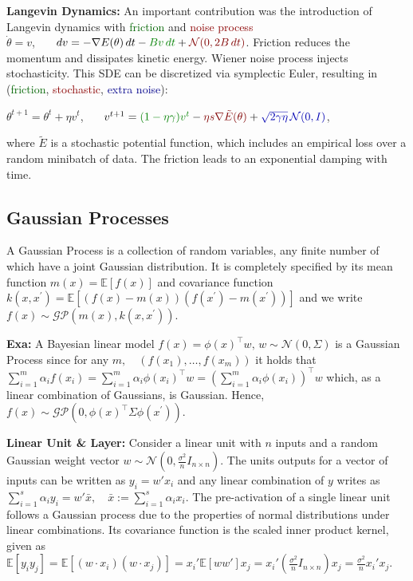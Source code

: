 \textbf{ Langevin Dynamics:}  An important contribution was the introduction of Langevin dynamics with \textcolor{darkgreen}{friction}
and \textcolor{darkred}{noise process}\\
$
\dot{\theta} = v
$, \ \ \
$
dv = -\nabla E(\theta) \, dt - \textcolor{darkgreen}{Bv \, dt} + \textcolor{darkred}{ \mathcal{N}(0, 2B \, dt)}
$.
Friction reduces the momentum and dissipates kinetic energy. Wiener noise process injects stochasticity. This SDE can be discretized via symplectic Euler, resulting in (\textcolor{darkgreen}{friction}, \textcolor{darkred}{stochastic}, \textcolor{darkblue}{extra noise}):
 
$
\theta^{t+1} = \theta^t + \eta v^t
$, \ \ \
$
v^{t+1} = \textcolor{darkgreen}{(1 - \eta \gamma) v^t} 
- \textcolor{darkred}{\eta s \nabla \tilde{E}(\theta)} 
+ \textcolor{darkblue}{\sqrt{2 \gamma \eta} \, \mathcal{N}(0, I)}
$,

where $\tilde{E}$ is a stochastic potential function, which includes an empirical loss over a random
 minibatch of data. The friction leads to an exponential damping with time.

\subsection{Gaussian Processes}
A Gaussian Process is a collection of random variables, any finite number of which have a joint Gaussian distribution. It is completely specified by its mean function $m(x)=\mathbb{E}[f(x)]$ and covariance function \(k(x, x^\prime)=\mathbb{E}[(f(x)-m(x))(f(x^\prime)-m(x^\prime))]\) and we write $f(x)\sim \mathcal{GP}(m(x), k(x, x^\prime))$. 

\textbf{Exa:} A Bayesian linear model $f(x)=\phi(x)^\top w, \, w\sim \mathcal{N}(0, \Sigma)$ is a Gaussian Process since for any $m, \quad (f(x_1), \ldots, f(x_m))$ it holds that \(\sum_{i=1}^m \alpha_i f(x_i) = \sum_{i=1}^m \alpha_i \phi(x_i)^\top w = (\sum_{i=1}^m \alpha_i \phi(x_i))^\top w \) which, as a linear combination of Gaussians, is Gaussian. Hence, $f(x) \sim \mathcal{GP}(0, \phi(x)^\top \Sigma \phi(x^\prime))$.

\textbf{Linear Unit \& Layer:} Consider a linear unit with $n$ inputs and a random Gaussian weight vector $w \sim \mathcal{N}\left(0, \frac{\sigma^2}{n} I_{n \times n}\right)
$. The units outputs for a vector of inputs can be written as $y_i = w' x_i$ and any linear combination of $y$ writes as $\sum_{i=1}^s \alpha_i y_i = w' \bar{x}, \quad \bar{x} := \sum_{i=1}^s \alpha_i x_i.$ The pre-activation of a single linear unit follows a Gaussian process due to the properties of normal distributions under linear combinations. Its covariance function is the scaled inner product kernel, given as \\
$\mathbb{E}[y_i y_j] = \mathbb{E}[(w \cdot x_i)(w \cdot x_j)] = x_i' \mathbb{E}[w w'] x_j = x_i' \left( \frac{\sigma^2}{n} I_{n \times n} \right) x_j = \frac{\sigma^2}{n} x_i' x_j.
$

